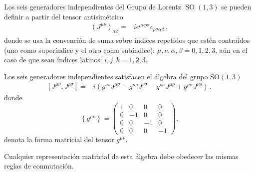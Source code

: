 \begin{frame}
  Los seis generadores independientes del Grupo de Lorentz $\operatorname{SO}(1,3)$ se pueden definir a partir del tensor antisimétrico
\begin{align}
   \left(J^{\mu\nu}\right)_{\alpha\beta}=&i\epsilon^{\mu\nu\rho\sigma}\epsilon_{\rho\sigma\alpha\beta}\,,
\end{align}
donde se usa la convención de suma sobre índices repetidos que estén contraídos (uno como superíndice y el otro como subíndice): $\mu,\nu,\alpha,\beta=0,1,2,3$, aún en el caso de que sean índices latinos: $i,j,k=1,2,3$. 


Los seis generadores independientes satisfacen el álgebra del grupo $\operatorname{SO(1,3)}$
\begin{align}
\label{eq:lrtalg}
  \left[{J}^{\mu\nu},{J}^{\rho\sigma}\right]=&
i(g^{\nu\rho}{J}^{\mu\sigma}-g^{\mu\rho}{J}^{\nu\sigma}-g^{\nu\sigma}{J}^{\mu\rho}+g^{\mu\sigma}{J}^{\nu\rho})\,,
\end{align}
donde 
\begin{equation}
  \left\{ g^{\mu\nu} \right\}=
  \begin{pmatrix}
    1&0&0&0\\
    0&-1&0&0\\
    0&0&-1&0\\
    0&0&0&-1
  \end{pmatrix},
\end{equation}
denota la forma matricial del tensor $g^{\mu\nu}$.  


Cualquier representación matricial de esta álgebra debe obedecer las mismas reglas de conmutación.


\end{frame}
